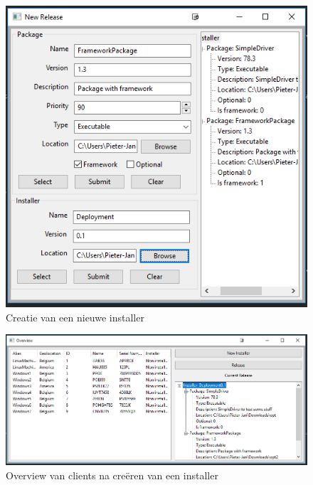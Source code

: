\begin{figure}[!ht]
\centering
\includegraphics[scale=0.9]{afbeelding/testMultiClient/Release.png}
\caption{Creatie van een nieuwe installer}
\label{fig:testClient:newRelease}
\end{figure}

\begin{figure}[!ht]
\centering
\includegraphics[width=\textwidth,keepaspectratio]{afbeelding/testMultiClient/JustBeforeRelease.png}
\caption{Overview van clients na creëren van een installer}
\label{fig:testClient:setupBeforeRelease}
\end{figure}

